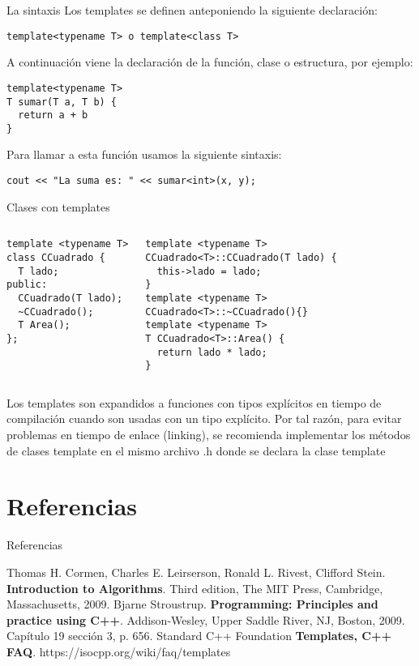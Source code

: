 \documentclass[aspectratio=169]{beamer}
\begin{document}
\begin{frame}[fragile]{La sintaxis}
  Los templates se definen anteponiendo la siguiente declaración:
  \begin{lstlisting}
template<typename T> o template<class T>
  \end{lstlisting}
  A continuación viene la declaración de la función, clase o estructura, por ejemplo:
  \begin{lstlisting}
template<typename T>
T sumar(T a, T b) {
  return a + b
}
  \end{lstlisting}
  Para llamar a esta función usamos la siguiente sintaxis:
  \begin{lstlisting}
cout << "La suma es: " << sumar<int>(x, y);
  \end{lstlisting}
\end{frame}

\begin{frame}[fragile]{Clases con templates}
  \begin{columns}
     \begin{lstlisting}
template <typename T>
class CCuadrado {
  T lado;
public:
  CCuadrado(T lado);
  ~CCuadrado();
  T Area();
};
    \end{lstlisting}
     \begin{lstlisting}
template <typename T>
CCuadrado<T>::CCuadrado(T lado) { 
  this->lado = lado;
}
template <typename T>
CCuadrado<T>::~CCuadrado(){}
template <typename T>
T CCuadrado<T>::Area() {
  return lado * lado;
}
    \end{lstlisting}
  \end{columns}
  \alert{Los templates son expandidos a funciones con tipos explícitos en tiempo de compilación cuando son usadas con un tipo explícito. Por tal razón, para evitar problemas en tiempo de enlace (linking), se recomienda implementar los métodos de clases template en el mismo archivo .h donde se declara la clase template}
\end{frame}

\section{Referencias}
\begin{frame}{Referencias}
  \begin{thebibliography}{9}
    Thomas H. Cormen, Charles E. Leirserson, Ronald L. Rivest, Clifford Stein.
    \textbf{Introduction to Algorithms}.
    Third edition, The MIT Press, Cambridge, Massachusetts, 2009.
    Bjarne Stroustrup.
    \textbf{Programming: Principles and practice using C++}.
    Addison-Wesley, Upper Saddle River, NJ, Boston, 2009. Capítulo 19 sección 3, p. 656.
    Standard C++ Foundation
    \textbf{Templates, C++ FAQ}. https://isocpp.org/wiki/faq/templates
  \end{thebibliography}
\end{frame}
\end{document}
